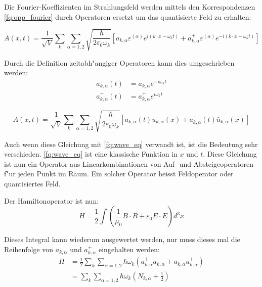 Die Fourier-Koeffizienten im Strahlungsfeld werden mittels den Korrespondenzen \ref{fq:opp_fourier} durch Operatoren ersetzt um das quantisierte Feld zu erhalten:

\begin{equation*}
A(x,t) = \frac{1}{\sqrt{V}} \sum_k \sum_{\alpha=1,2} \sqrt{\frac{\hbar}{2 \varepsilon_0 \omega_k}} \left[a_{k,\alpha} \varepsilon^{(\alpha)} e^{i (k \cdot x - \omega_k t)} + a^+_{k,\alpha} \varepsilon^{(\alpha)} e^{-i (k \cdot x - \omega_k t)}\right]
\end{equation*}

Durch die Definition zeitabh"angiger Operatoren kann dies umgeschrieben werden:
\begin{align*}
a_{k,\alpha}(t) &= a_{k,\alpha} e^{-i \omega_k t} \\
a^+_{k,\alpha}(t) &= a^+_{k,\alpha} e^{i \omega_k t}
\end{align*}

\begin{equation*}
A(x,t) = \frac{1}{\sqrt{V}} \sum_k \sum_{\alpha=1,2} \sqrt{\frac{\hbar}{2 \varepsilon_0 \omega_k}}\left[a_{k,\alpha}(t) u_{k,\alpha}(x) + a^+_{k,\alpha}(t) \bar{u}_{k,\alpha}(x) \right]
\end{equation*}

Auch wenn diese Gleichung mit \ref{fq:wave_eq} verwandt ist, ist die Bedeutung sehr verschieden. \ref{fq:wave_eq} ist eine klassische Funktion in $x$ und $t$. Diese Gleichung ist nun ein Operator aus Linearkombinationen von Auf- und Absteigeoperatoren f"ur jeden Punkt im Raum. Ein solcher Operator heisst Feldoperator oder quantisiertes Feld.

Der Hamiltonoperator ist nun:
\begin{equation*}
H = \frac{1}{2} \int \left(\frac{1}{\mu_0} B \cdot B + \varepsilon_0 E \cdot E \right) d^3 x
\end{equation*}

Dieses Integral kann wiederum ausgewertet werden, nur muss dieses mal die Reihenfolge von $a_{k,\alpha}$ und $a^+_{k,\alpha}$ eingehalten werden:
\begin{equation*}
\begin{split}
H &= \frac{1}{2} \sum_k \sum_{\alpha=1,2} \hbar \omega_k \left(a^+_{k,\alpha} a_{k,\alpha} + a_{k,\alpha} a^+_{k,\alpha}\right) \\
&= \sum_k \sum_{\alpha=1,2} \hbar \omega_k \left(N_{k,\alpha} + \frac{1}{2} \right)
\end{split}
\end{equation*}

